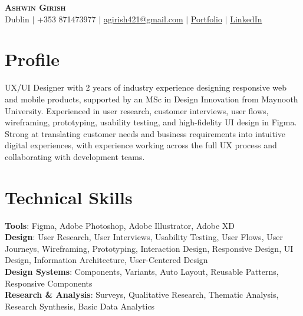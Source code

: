 \documentclass[letterpaper,11pt]{article}
\begin{document}
\begin{center}
    \textbf{\Huge \scshape Ashwin Girish} \\ \vspace{1pt}
    \small Dublin $|$ +353 871473977 $|$ \href{mailto:agirish421@gmail.com}{agirish421@gmail.com} $|$
    \href{https://ashwin-girish-portfolio.vercel.app/}{Portfolio} $|$
    \href{https://www.linkedin.com/in/ashwingirishh/}{LinkedIn}
\end{center}


\section{Profile}
\small{UX/UI Designer with 2 years of industry experience designing responsive web and mobile products, supported by an MSc in Design Innovation from Maynooth University. Experienced in user research, customer interviews, user flows, wireframing, prototyping, usability testing, and high-fidelity UI design in Figma. Strong at translating customer needs and business requirements into intuitive digital experiences, with experience working across the full UX process and collaborating with development teams.}

\vspace{0.1cm}

\section{Technical Skills}
 \begin{itemize}[leftmargin=0.15in, label={}]
    \small{\item{
     \textbf{Tools}{: Figma, Adobe Photoshop, Adobe Illustrator, Adobe XD} \\
     \textbf{Design}{: User Research, User Interviews, Usability Testing, User Flows, User Journeys, Wireframing, Prototyping, Interaction Design, Responsive Design, UI Design, Information Architecture, User-Centered Design} \\
     \textbf{Design Systems}{: Components, Variants, Auto Layout, Reusable Patterns, Responsive Components} \\
     \textbf{Research \& Analysis}{: Surveys, Qualitative Research, Thematic Analysis, Research Synthesis, Basic Data Analytics} \\
    }}
 \end{itemize}

\end{document}
